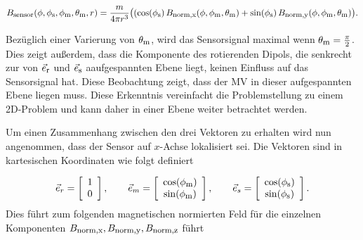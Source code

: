	\begin{equation}
		B_{\textrm{\footnotesize{sensor}}}(\phi,\phi_{\textrm{\footnotesize{s}}},\phi_{\textrm{\footnotesize{m}}},\theta_{\textrm{\footnotesize{m}}},r) =  \frac{ m }{4 \pi r^3} \big((\cos(\phi_{\textrm{\footnotesize{s}}})\, B_{\textrm{\footnotesize{norm,x}}}(\phi,\phi_{\textrm{\footnotesize{m}}},\theta_{\textrm{\footnotesize{m}}}) + \sin(\phi_{\textrm{\footnotesize{s}}})\, B_{\textrm{\footnotesize{norm,y}}}(\phi,\phi_{\textrm{\footnotesize{m}}},\theta_{\textrm{\footnotesize{m}}})\big).
		\label{eq:normSensor}
	\end{equation}

	Bezüglich einer Varierung von $\theta_{\textrm{\footnotesize{m}}}$, wird das Sensorsignal maximal wenn $\theta_{\textrm{\footnotesize{m}}} = \frac{\pi}{2}$. Dies zeigt außerdem, dass die Komponente des rotierenden Dipols, die senkrecht zur von $\vec{e}_{\textrm{\footnotesize{r}}}$ und $\vec{e}_{\textrm{\footnotesize{s}}}$ aaufgespannten Ebene liegt, keinen Einfluss auf das Sensorsignal hat. Diese Beobachtung zeigt, dass der MV in dieser aufgespannten Ebene liegen muss. Diese Erkenntnis vereinfacht die Problemstellung zu einem 2D-Problem und kann daher in einer Ebene weiter betrachtet werden.

	Um einen Zusammenhang zwischen den drei Vektoren zu erhalten wird nun angenommen, dass der Sensor auf $x$-Achse lokalisiert sei. Die Vektoren sind in kartesischen Koordinaten wie folgt definiert

	\begin{equation}
		\vec{e}_r = \left[\begin{array}{c} 1\\ 0 \end{array}\right],\qquad
		\vec{e}_m = \left[\begin{array}{c} \cos(\phi_{\textrm{\footnotesize{m}}}) \\ \sin(\phi_{\textrm{\footnotesize{m}}}) \end{array}\right],\qquad
		\vec{e}_s = \left[\begin{array}{c} \cos(\phi_{\textrm{\footnotesize{s}}})\\ \sin(\phi_{\textrm{\footnotesize{s}}})\end{array}\right].
		\label{eq:defErEmEs}
	\end{equation}
	Dies führt zum folgenden magnetischen normierten Feld für die einzelnen Komponenten $B_{\textrm{\footnotesize{norm,x}}},B_{\textrm{\footnotesize{norm,y}}},B_{\textrm{\footnotesize{norm,z}}}$ führt 

